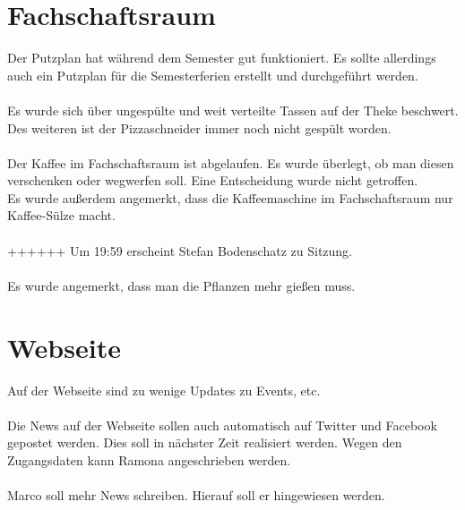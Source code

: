 \documentclass[a4paper, 11pt]{article} %
\begin{document}
\section{Fachschaftsraum}
Der Putzplan hat während dem Semester gut funktioniert. Es sollte allerdings auch ein Putzplan für die Semesterferien erstellt und durchgeführt werden. \\
\\
Es wurde sich über ungespülte und weit verteilte Tassen auf der Theke beschwert. \\
Des weiteren ist der Pizzaschneider immer noch nicht gespült worden. \\
\\
Der Kaffee im Fachschaftsraum ist abgelaufen. Es wurde überlegt, ob man diesen verschenken oder wegwerfen soll. Eine Entscheidung wurde nicht getroffen. \\
Es wurde außerdem angemerkt, dass die Kaffeemaschine im Fachschaftsraum nur Kaffee-Sülze macht. \\
\\++++++
Um 19:59 erscheint Stefan Bodenschatz zu Sitzung. \\
\\
Es wurde angemerkt, dass man die Pflanzen mehr gießen muss. \\

\section{Webseite}
Auf der Webseite sind zu wenige Updates zu Events, etc. \\
\\
Die News auf der Webseite sollen auch automatisch auf Twitter und Facebook gepostet werden. Dies soll in nächster Zeit realisiert werden. Wegen den Zugangsdaten kann Ramona angeschrieben werden. \\
\\
Marco soll mehr News schreiben. Hierauf soll er hingewiesen werden. \\
\end{document}
